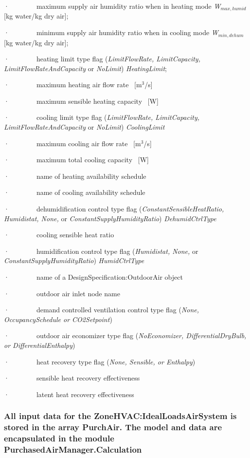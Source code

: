 ·~~~~~~~~maximum supply air humidity ratio when in heating mode \emph{W\(_{max,humid}\)} {[}kg water/kg dry air{]};

·~~~~~~~~minimum supply air humidity ratio when in cooling mode \emph{W\(_{min,dehum}\)} {[}kg water/kg dry air{]};

·~~~~~~~~heating limit type flag (\emph{LimitFlowRate, LimitCapacity, LimitFlowRateAndCapacity} or \emph{NoLimit}) \emph{HeatingLimit};

·~~~~~~~~maximum heating air flow rate~ {[}m\(^{3}\)/s{]}

·~~~~~~~~maximum sensible heating capacity~ {[}W{]}

·~~~~~~~~cooling limit type flag (\emph{LimitFlowRate, LimitCapacity, LimitFlowRateAndCapacity} or \emph{NoLimit}) \emph{CoolingLimit}

·~~~~~~~~maximum cooling air flow rate~ {[}m\(^{3}\)/s{]}

·~~~~~~~~maximum total cooling capacity~ {[}W{]}

·~~~~~~~~name of heating availability schedule

·~~~~~~~~name of cooling availability schedule

·~~~~~~~~dehumidification control type flag (\emph{ConstantSensibleHeatRatio, Humidistat, None,} or \emph{ConstantSupplyHumidityRatio}) \emph{DehumidCtrlType}

·~~~~~~~~cooling sensible heat ratio

·~~~~~~~~humidification control type flag (\emph{Humidistat, None,} or \emph{ConstantSupplyHumidityRatio}) \emph{HumidCtrlType}

·~~~~~~~~name of a DesignSpecification:OutdoorAir object

·~~~~~~~~outdoor air inlet node name

·~~~~~~~~demand controlled ventilation control type flag (\emph{None, OccupancySchedule or CO2Setpoint})

·~~~~~~~~outdoor air economizer type flag (\emph{NoEconomizer, DifferentialDryBulb, or DifferentialEnthalpy})

·~~~~~~~~heat recovery type flag (\emph{None, Sensible, or Enthalpy})

·~~~~~~~~sensible heat recovery effectiveness

·~~~~~~~~latent heat recovery effectiveness

\subsubsection{All input data for the ZoneHVAC:IdealLoadsAirSystem is stored in the array PurchAir. The model and data are encapsulated in the module PurchasedAirManager.Calculation}\label{all-input-data-for-the-zonehvacidealloadsairsystem-is-stored-in-the-array-purchair.-the-model-and-data-are-encapsulated-in-the-module-purchasedairmanager.calculation}

